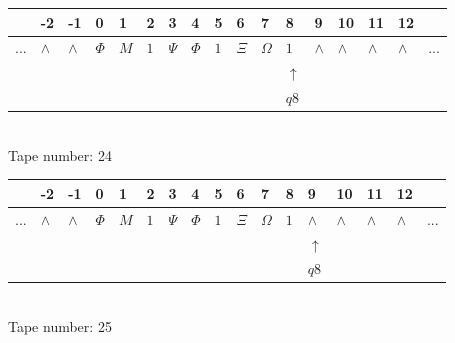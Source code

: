 \documentclass[11pt]{article}
\begin{document}
\begin{table}[H]
\centering
\begin{tabular}{lllllllllllllllll}
 & -2 & -1 & 0 & 1 & 2 & 3 & 4 & 5 & 6 & 7 & 8 & 9 & 10 & 11 & 12 & \\
\hline
$...$ & \multicolumn{1}{|l|}{$\wedge$} & \multicolumn{1}{|l|}{$\wedge$} & \multicolumn{1}{|l|}{$\Phi$} & \multicolumn{1}{|l|}{$M$} & \multicolumn{1}{|l|}{$1$} & \multicolumn{1}{|l|}{$\Psi$} & \multicolumn{1}{|l|}{$\Phi$} & \multicolumn{1}{|l|}{$1$} & \multicolumn{1}{|l|}{$\Xi$} & \multicolumn{1}{|l|}{$\Omega$} & \multicolumn{1}{|l|}{$1$} & \multicolumn{1}{|l|}{$\wedge$} & \multicolumn{1}{|l|}{$\wedge$} & \multicolumn{1}{|l|}{$\wedge$} & \multicolumn{1}{|l|}{$\wedge$} & $...$\\
\hline
&  &  &  &  &  &  &  &  &  &  & $\uparrow$ &  &  &  &  &  \\
&  &  &  &  &  &  &  &  &  &  & $ q8 $ &  &  &  &  &  \\
\end{tabular}
\\
Tape number: 24
\noindent\makebox[\linewidth]{\hdashrule{\textwidth}{1pt}{1pt}}\end{table}

\begin{table}[H]
\centering
\begin{tabular}{lllllllllllllllll}
 & -2 & -1 & 0 & 1 & 2 & 3 & 4 & 5 & 6 & 7 & 8 & 9 & 10 & 11 & 12 & \\
\hline
$...$ & \multicolumn{1}{|l|}{$\wedge$} & \multicolumn{1}{|l|}{$\wedge$} & \multicolumn{1}{|l|}{$\Phi$} & \multicolumn{1}{|l|}{$M$} & \multicolumn{1}{|l|}{$1$} & \multicolumn{1}{|l|}{$\Psi$} & \multicolumn{1}{|l|}{$\Phi$} & \multicolumn{1}{|l|}{$1$} & \multicolumn{1}{|l|}{$\Xi$} & \multicolumn{1}{|l|}{$\Omega$} & \multicolumn{1}{|l|}{$1$} & \multicolumn{1}{|l|}{$\wedge$} & \multicolumn{1}{|l|}{$\wedge$} & \multicolumn{1}{|l|}{$\wedge$} & \multicolumn{1}{|l|}{$\wedge$} & $...$\\
\hline
&  &  &  &  &  &  &  &  &  &  &  & $\uparrow$ &  &  &  &  \\
&  &  &  &  &  &  &  &  &  &  &  & $ q8 $ &  &  &  &  \\
\end{tabular}
\\
Tape number: 25
\noindent\makebox[\linewidth]{\hdashrule{\textwidth}{1pt}{1pt}}\end{table}
\end{document}
